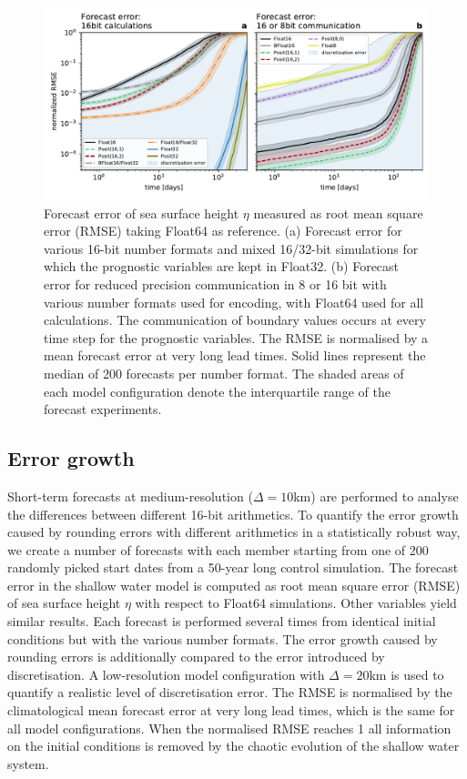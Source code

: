 \begin{figure}
\includegraphics[width=1\textwidth]{Figures/swm/rmse_eta_darker.pdf}
\caption{Forecast error of sea surface height $\eta$ measured as root mean square
error (RMSE) taking Float64 as reference. (a) Forecast error for various 16-bit
number formats and mixed 16/32-bit simulations for which the prognostic variables
are kept in Float32. (b) Forecast error for reduced precision communication in
8 or 16 bit with various number formats used for encoding, with Float64 used for
all calculations. The communication of boundary values occurs at every time step
for the prognostic variables. The RMSE is normalised by a mean forecast error at
very long lead times. Solid lines represent the median of 200 forecasts per number
format. The shaded areas of each model configuration denote the interquartile
range of the forecast experiments.}
\label{fig:rmse}
\end{figure}

\subsection{Error growth}

Short-term forecasts at medium-resolution ($\Delta = 10$km) are performed to
analyse the differences between different 16-bit arithmetics. To quantify the error
growth caused by rounding errors with different arithmetics in a statistically
robust way, we create a number of forecasts with each member starting from one
of 200 randomly picked start dates from a 50-year long control simulation. The
forecast error in the shallow water model is computed as root mean square error
(RMSE) of sea surface height $\eta$ with respect to Float64 simulations. Other
variables yield similar results. Each forecast is performed several times from
identical initial conditions but with the various number formats. The error growth
caused by rounding errors is additionally compared to the error
introduced by discretisation. A low-resolution model configuration with
$\Delta = 20$km is used to quantify a realistic level of discretisation error.
The RMSE is normalised by the climatological mean forecast error at very long lead
times, which is the same for all model configurations. When the normalised RMSE
reaches 1 all information on the initial conditions is removed by the chaotic
evolution of the shallow water system.

